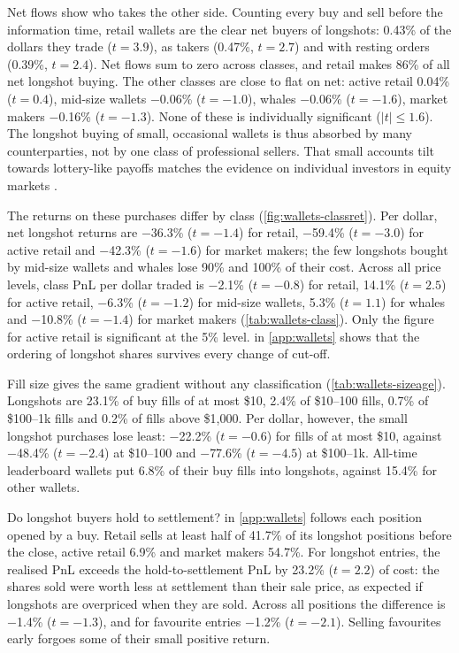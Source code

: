 Net flows show who takes the other side. Counting every buy and sell before the information time,
retail wallets are the clear net buyers of longshots: 0.43\% of the dollars they trade
($t=3.9$), as takers (0.47\%, $t=2.7$) and with resting orders (0.39\%,
$t=2.4$). Net flows sum to zero across classes, and retail makes 86\% of all net longshot
buying. The other classes are close to flat on net: active retail 0.04\% ($t=0.4$), mid-size wallets $-$0.06\% ($t=-1.0$), whales $-$0.06\% ($t=-1.6$), market makers $-$0.16\% ($t=-1.3$). None of these is individually significant
($|t|\leq1.6$). The longshot buying of small, occasional wallets is thus absorbed by many counterparties,
not by one class of professional sellers. That small accounts tilt towards lottery-like payoffs matches the evidence on
individual investors in equity markets \citep{kumar2009}.

The returns on these purchases differ by class (\cref{fig:wallets-classret}). Per dollar, net longshot returns
are $-$36.3\% ($t=-1.4$) for retail, $-$59.4\% ($t=-3.0$) for active retail and $-$42.3\% ($t=-1.6$) for market makers;
the few longshots bought by mid-size wallets and whales lose 90\% and 100\% of
their cost. Across all
price levels, class PnL per dollar traded is $-$2.1\% ($t=-0.8$) for retail, 14.1\% ($t=2.5$) for
active retail, $-$6.3\% ($t=-1.2$) for mid-size wallets, 5.3\% ($t=1.1$) for whales and $-$10.8\% ($t=-1.4$) for market
makers (\cref{tab:wallets-class}). Only the figure for active retail is significant at the 5\% level.
 in \cref{app:wallets} shows that the ordering of longshot shares survives every change of cut-off.

Fill size gives the same gradient without any classification (\cref{tab:wallets-sizeage}). Longshots are
23.1\% of buy fills of at most \$10, 2.4\% of \$10--100 fills,
0.7\% of \$100--1k fills and 0.2\% of fills above \$1{,}000. Per dollar,
however, the small longshot purchases lose least: $-$22.2\% ($t=-0.6$) for fills of at most \$10,
against $-$48.4\% ($t=-2.4$) at \$10--100 and $-$77.6\% ($t=-4.5$) at
\$100--1k. All-time
leaderboard wallets put 6.8\% of their buy fills into longshots, against 15.4\% for other
wallets.

Do longshot buyers hold to settlement?  in \cref{app:wallets} follows each position
opened by a buy. Retail sells at least half of 41.7\% of its longshot positions before the close, active
retail 6.9\% and market makers 54.7\%. For longshot entries, the realised PnL exceeds
the hold-to-settlement PnL by 23.2\% ($t=2.2$) of cost: the shares sold were worth less at settlement than their sale
price, as expected if longshots are overpriced when they are sold. Across all positions the difference is
$-$1.4\% ($t=-1.3$), and for favourite entries $-$1.2\% ($t=-2.1$). Selling favourites early forgoes some of their small
positive return.

